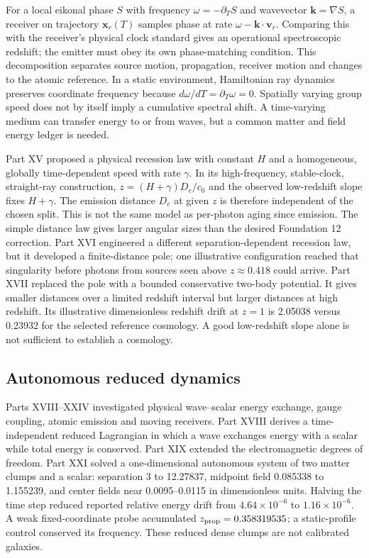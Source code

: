 \documentclass[
  11pt,
  twoside]{article}
\begin{document}
For a local eikonal phase \(S\) with frequency \(\omega=-\partial_T S\)
and wavevector \(\mathbf{k}=\nabla S\), a receiver on trajectory
\(\mathbf{x}_r(T)\) samples phase at rate
\(\omega-\mathbf{k}\cdot\mathbf{v}_r\). Comparing this with the
receiver's physical clock standard gives an operational spectroscopic
redshift; the emitter must obey its own phase-matching condition. This
decomposition separates source motion, propagation, receiver motion and
changes to the atomic reference. In a static environment, Hamiltonian
ray dynamics preserves coordinate frequency because
\(d\omega/dT=\partial_T\omega=0\). Spatially varying group speed does
not by itself imply a cumulative spectral shift. A time-varying medium
can transfer energy to or from waves, but a common matter and field
energy ledger is needed.

Part XV proposed a physical recession law with constant \(H\) and a
homogeneous, globally time-dependent speed with rate \(\gamma\). In its
high-frequency, stable-clock, straight-ray construction,
\(z=(H+\gamma)D_e/c_0\) and the observed low-redshift slope fixes
\(H+\gamma\). The emission distance \(D_e\) at given \(z\) is therefore
independent of the chosen split. This is not the same model as
per-photon aging since emission. The simple distance law gives larger
angular sizes than the desired Foundation 12 correction. Part XVI
engineered a different separation-dependent recession law, but it
developed a finite-distance pole; one illustrative configuration reached
that singularity before photons from sources seen above
\(z\approx0.418\) could arrive. Part XVII replaced the pole with a
bounded conservative two-body potential. It gives smaller distances over
a limited redshift interval but larger distances at high redshift. Its
illustrative dimensionless redshift drift at \(z=1\) is 2.05038 versus
0.23932 for the selected reference cosmology. A good low-redshift slope
alone is not sufficient to establish a cosmology.

\subsection{Autonomous reduced
dynamics}\label{autonomous-reduced-dynamics}

Parts XVIII--XXIV investigated physical wave--scalar energy exchange,
gauge coupling, atomic emission and moving receivers. Part XVIII derives
a time-independent reduced Lagrangian in which a wave exchanges energy
with a scalar while total energy is conserved. Part XIX extended the
electromagnetic degrees of freedom. Part XXI solved a one-dimensional
autonomous system of two matter clumps and a scalar: separation 3 to
12.27837, midpoint field 0.085338 to 1.155239, and center fields near
0.0095--0.0115 in dimensionless units. Halving the time step reduced
reported relative energy drift from \(4.64\times10^{-6}\) to
\(1.16\times10^{-6}\). A weak fixed-coordinate probe accumulated
\(z_{\rm prop}=0.358319535\); a static-profile control conserved its
frequency. These reduced dense clumps are not calibrated galaxies.
\end{document}
